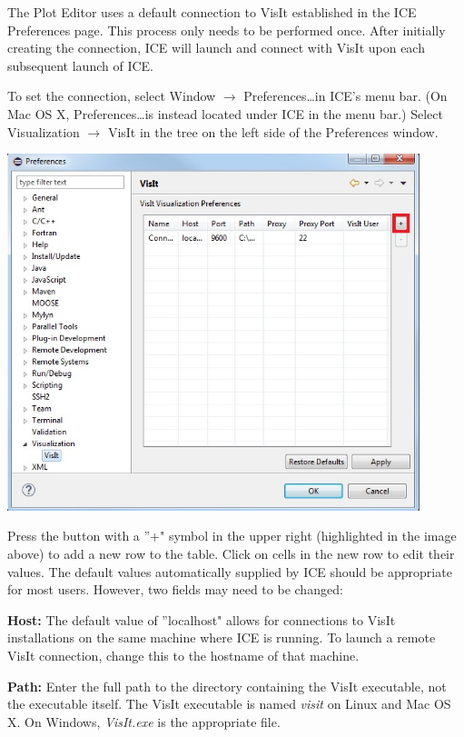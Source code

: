 The Plot Editor uses a default connection to VisIt established in the ICE
Preferences page. This process only needs to be performed once. After initially
creating the connection, ICE will launch and connect with VisIt upon each
subsequent launch of ICE.

To set the connection, select Window $\rightarrow$ Preferences\ldots in ICE's
menu bar. (On Mac OS X, Preferences\ldots is instead located under ICE in the
menu bar.) Select Visualization $\rightarrow$ VisIt in the tree on the left side
of the Preferences window.

\begin{center}
\includegraphics[width=12cm]{images/VisItPreferencePage_ICE}
\end{center}

Press the button with a ''+" symbol in the upper right (highlighted in the image
above) to add a new row to the table. Click on cells in the new row to edit
their values. The default values automatically supplied by ICE should be
appropriate for most users. However, two fields may need to be changed:

\textbf{Host:} The default value of ''localhost" allows for connections to VisIt
installations on the same machine where ICE is running. To launch a remote VisIt
connection, change this to the hostname of that machine.

\textbf{Path:} Enter the full path to the directory containing the VisIt
executable, not the executable itself. The VisIt executable is named
\textit{visit} on Linux and Mac OS X. On Windows, \textit{VisIt.exe} is the
appropriate file.

